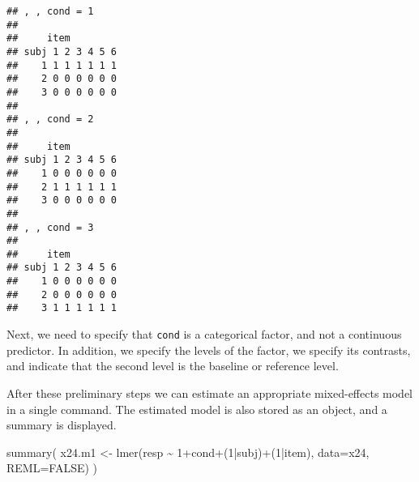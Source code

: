 \documentclass[
]{book}
\newenvironment{Shaded}{\begin{snugshade}}{\end{snugshade}}
\newcommand{\AttributeTok}[1]{\textcolor[rgb]{0.77,0.63,0.00}{#1}}
\newcommand{\ConstantTok}[1]{\textcolor[rgb]{0.00,0.00,0.00}{#1}}
\newcommand{\DecValTok}[1]{\textcolor[rgb]{0.00,0.00,0.81}{#1}}
\newcommand{\FunctionTok}[1]{\textcolor[rgb]{0.00,0.00,0.00}{#1}}
\newcommand{\NormalTok}[1]{#1}
\newcommand{\OtherTok}[1]{\textcolor[rgb]{0.56,0.35,0.01}{#1}}
\newcommand{\SpecialCharTok}[1]{\textcolor[rgb]{0.00,0.00,0.00}{#1}}
\newcommand{\StringTok}[1]{\textcolor[rgb]{0.31,0.60,0.02}{#1}}
\begin{document}
\begin{verbatim}
## , , cond = 1
## 
##     item
## subj 1 2 3 4 5 6
##    1 1 1 1 1 1 1
##    2 0 0 0 0 0 0
##    3 0 0 0 0 0 0
## 
## , , cond = 2
## 
##     item
## subj 1 2 3 4 5 6
##    1 0 0 0 0 0 0
##    2 1 1 1 1 1 1
##    3 0 0 0 0 0 0
## 
## , , cond = 3
## 
##     item
## subj 1 2 3 4 5 6
##    1 0 0 0 0 0 0
##    2 0 0 0 0 0 0
##    3 1 1 1 1 1 1
\end{verbatim}

Next, we need to specify that \texttt{cond} is a
categorical factor, and not a continuous predictor. In addition, we
specify the levels of the factor, we specify its contrasts, and indicate
that the second level is the baseline or reference level.

\begin{Shaded}
\end{Shaded}

After these preliminary steps we can estimate an appropriate mixed-effects
model in a single command. The estimated model is also stored as an
object, and a summary is displayed.

\begin{Shaded}
\begin{Highlighting}[]
\FunctionTok{summary}\NormalTok{( x24.m1 }\OtherTok{\textless{}{-}} \FunctionTok{lmer}\NormalTok{(resp }\SpecialCharTok{\textasciitilde{}} \DecValTok{1}\SpecialCharTok{+}\NormalTok{cond}\SpecialCharTok{+}\NormalTok{(}\DecValTok{1}\SpecialCharTok{|}\NormalTok{subj)}\SpecialCharTok{+}\NormalTok{(}\DecValTok{1}\SpecialCharTok{|}\NormalTok{item),}
                        \AttributeTok{data=}\NormalTok{x24, }\AttributeTok{REML=}\ConstantTok{FALSE}\NormalTok{) )}
\end{Highlighting}
\end{Shaded}
\end{document}
